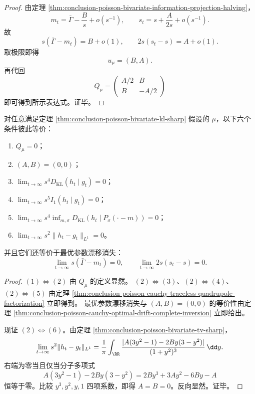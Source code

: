 \begin{proof}
由定理 \ref{thm:conclusion-poisson-bivariate-information-projection-halving}，
\[
m_t=\bar\Gamma-\frac{B}{s}+o(s^{-1}),
\qquad
s_t=s+\frac{A}{2s}+o(s^{-1}).
\]
故
\[
s(\bar\Gamma-m_t)=B+o(1),
\qquad
2s(s_t-s)=A+o(1).
\]
取极限即得
\[
u_\mu=(B,A).
\]
再代回
\[
Q_\mu=
\begin{pmatrix}
A/2 & B\\
B & -A/2
\end{pmatrix}
\]
即可得到所示表达式。证毕。
\end{proof}

\begin{theorem}\label{thm:conclusion-poisson-cauchy-second-order-fingerprint-metric-vanishing}
对任意满足定理 \ref{thm:conclusion-poisson-bivariate-kl-sharp} 假设的 \(\mu\)，以下六个条件彼此等价：
\begin{enumerate}
  \item \(Q_\mu=0\)；
  \item \((A,B)=(0,0)\)；
  \item \(\displaystyle \lim_{t\to\infty}s^4D_{\mathrm{KL}}(h_t\mid g_t)=0\)；
  \item \(\displaystyle \lim_{t\to\infty}s^5I_1(h_t\mid g_t)=0\)；
  \item \(\displaystyle \lim_{t\to\infty}s^4\inf_{m,\sigma}D_{\mathrm{KL}}(h_t\mid P_\sigma(\cdot-m))=0\)；
  \item \(\displaystyle \lim_{t\to\infty}s^2\|h_t-g_t\|_{L^1}=0\)。
\end{enumerate}
并且它们还等价于最优参数漂移消失：
\[
\lim_{t\to\infty}s(\bar\Gamma-m_t)=0,
\qquad
\lim_{t\to\infty}2s(s_t-s)=0.
\]
\end{theorem}

\begin{proof}
\((1)\iff(2)\) 由 \(Q_\mu\) 的定义显然。
\((2)\iff(3)\)、\((2)\iff(4)\)、\((2)\iff(5)\) 由定理 \ref{thm:conclusion-poisson-cauchy-traceless-quadrupole-factorization} 立即得到。
最优参数漂移消失与 \((A,B)=(0,0)\) 的等价性由定理 \ref{thm:conclusion-poisson-cauchy-optimal-drift-complete-inversion} 立即给出。

现证 \((2)\iff(6)\)。由定理 \ref{thm:conclusion-poisson-bivariate-tv-sharp}，
\[
\lim_{t\to\infty}s^2\|h_t-g_t\|_{L^1}
=
\frac{1}{\pi}\int_{\RR}
\frac{|A(3y^2-1)-2By(3-y^2)|}{(1+y^2)^3}\,\dd y.
\]
右端为零当且仅当分子多项式
\[
A(3y^2-1)-2By(3-y^2)
=
2By^3+3Ay^2-6By-A
\]
恒等于零。比较 \(y^3,y^2,y,1\) 四项系数，即得 \(A=B=0\)。反向显然。证毕。
\end{proof}

